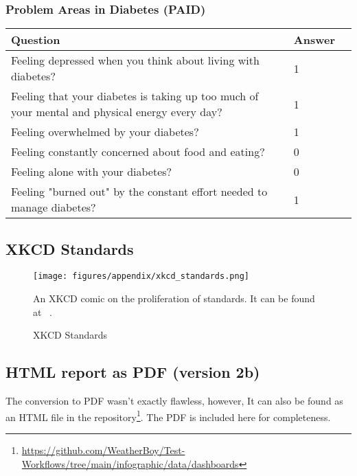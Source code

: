 \subsubsection{Problem Areas in Diabetes (PAID)}
\begin{table}[H]
    \centering
    \renewcommand{\arraystretch}{1.2}
    \begin{tabularx}{\textwidth}{|l|X|l|}
        \hline
        \textbf{Question} & \textbf{Answer} \\ \hline
        Feeling depressed when you think about living with diabetes? &
        1
        \\ \hline
        Feeling that your diabetes is taking up too much of your mental and physical energy every day? &
        1
        \\ \hline
        Feeling overwhelmed by your diabetes? &
        1
        \\ \hline
        Feeling constantly concerned about food and eating? &
        0
        \\ \hline
        Feeling alone with your diabetes? &
        0
        \\ \hline
        Feeling "burned out" by the constant effort needed to manage diabetes? &
        1
        \\ \hline
    \end{tabularx}
\end{table}


\subsection{XKCD Standards}\label{sec:XKCD-standards}
\begin{figure}[H]
    \centering
    \texttt{[image: figures/appendix/xkcd\_standards.png]}
    \caption{XKCD Standards}
    \medskip
    \small
    \raggedright
    An XKCD comic on the proliferation of standards. It can be found at ~\cite{XKCD-standards}.
    \label{fig:XKCD-standards}
\end{figure}

\subsection{HTML report as PDF (version 2b)}\label{sec:html-report-pdf}
The conversion to PDF wasn't exactly flawless, however, It can also be found as an HTML file in the repository\footnote{\href{https://github.com/WeatherBoy/Test-Workflows/tree/main/infographic/data/dashboards}{https://github.com/WeatherBoy/Test-Workflows/tree/main/infographic/data/dashboards}}. The PDF is included here for completeness.
